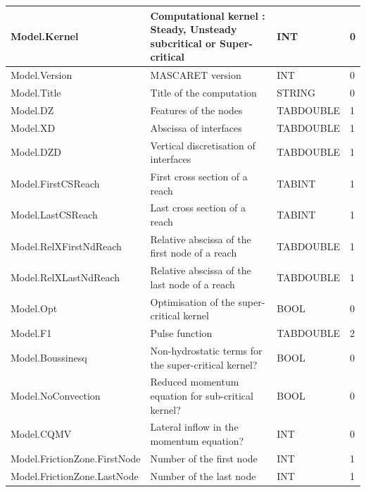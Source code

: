 \documentclass[a4paper,11pt]{article}
\begin{document}
\begin{landscape}
\begin{table}[ht]
\begin{center}
\begin{tabular}{|l|l|l|l|}
\hline  Model.Kernel & Computational kernel : Steady, Unsteady subcritical or Super-critical & INT & 0 \\
\hline  Model.Version & MASCARET version & INT & 0 \\
\hline  Model.Title & Title of the computation & STRING & 0 \\
\hline  Model.DZ & Features of the nodes & TABDOUBLE & 1 \\
\hline  Model.XD & Abscissa of interfaces & TABDOUBLE & 1 \\
\hline  Model.DZD & Vertical discretisation of interfaces & TABDOUBLE & 1 \\
\hline  Model.FirstCSReach & First cross section of a reach & TABINT & 1 \\
\hline  Model.LastCSReach & Last cross section of a reach & TABINT & 1 \\
\hline  Model.RelXFirstNdReach & Relative abscissa of the first node of a reach & TABDOUBLE & 1 \\
\hline  Model.RelXLastNdReach & Relative abscissa of the last node of a reach & TABDOUBLE & 1 \\
\hline  Model.Opt & Optimisation of the super-critical kernel & BOOL & 0 \\
\hline  Model.F1 & Pulse function & TABDOUBLE & 2 \\
\hline  Model.Boussinesq & Non-hydrostatic terms for the super-critical kernel? & BOOL & 0 \\
\hline  Model.NoConvection & Reduced momentum equation for sub-critical kernel? & BOOL & 0 \\
\hline  Model.CQMV & Lateral inflow in the momentum equation? & INT & 0 \\
\hline  Model.FrictionZone.FirstNode & Number of the first node & INT & 1 \\
\hline  Model.FrictionZone.LastNode & Number of the last node & INT & 1 \\

\hline 
\end{tabular} 
\end{center}
\end{table}
\begin{table}[ht]
\begin{center}
\begin{tabular}{|l|l|l|l|}


\end{tabular}
\end{center}
\end{table}
\end{landscape}
\end{document}
